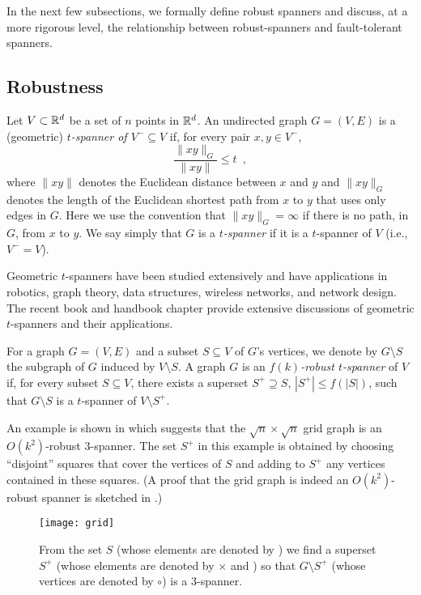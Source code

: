 \documentclass{cccg12}
\begin{document}
In the next few subsections, we formally define robust spanners
and discuss, at a more rigorous level, the relationship between
robust-spanners and fault-tolerant spanners.

\subsection{Robustness}

Let $V\subset \mathbb{R}^d$ be a set of $n$ points in $\mathbb{R}^d$.  An undirected
graph $G=(V,E)$ is a (geometric) \emph{$t$-spanner of $V^-\subseteq V$}
if, for every pair $x,y\in V^-$,
\[
  \frac{\|xy\|_G}{\|xy\|} \le t \enspace ,
\]
where $\|xy\|$ denotes the Euclidean distance between $x$ and $y$ and
$\|xy\|_G$ denotes the length of the Euclidean shortest path from $x$
to $y$ that uses only edges in $G$.  Here we use the convention that
$\|xy\|_G=\infty$ if there is no path, in $G$, from $x$ to $y$.  We say
simply that $G$ is a \emph{$t$-spanner} if it is a $t$-spanner of $V$
(i.e., $V^-=V$).

Geometric $t$-spanners have been studied extensively and have applications
in robotics, graph theory, data structures, wireless networks, and
network design.  The recent book \cite{ns07} and handbook chapter
\cite{e99} provide extensive discussions of geometric $t$-spanners and
their applications.

For a graph $G=(V,E)$ and a subset $S\subseteq V$ of $G$'s vertices, we
denote by $G\setminus S$ the subgraph of $G$ induced by $V\setminus S$.
A graph $G$ is an \emph{$f(k)$-robust $t$-spanner} of $V$ if, for every
subset $S\subseteq V$, there exists a superset $S^+\supseteq S$, $|S^+|\le
f(|S|)$, such that $G\setminus S$ is a $t$-spanner of $V\setminus S^+$.

An example is shown in  which suggests that the
$\sqrt{n}\times\sqrt{n}$ grid graph is an $O(k^2)$-robust 3-spanner.
The set $S^+$ in this example is obtained by choosing ``disjoint''
squares that cover the vertices of $S$ and adding to $S^+$ any vertices
contained in these squares.  (A proof that the grid graph is indeed an
$O(k^2)$-robust spanner is sketched in .)

\begin{figure}
  \begin{center}
    \texttt{[image: grid]}
  \end{center}
  \caption{From the set $S$ (whose elements are denoted by \textbullet)
  we find a superset $S^+$ (whose elements are denoted by $\times$ and
  \textbullet) so that $G\setminus S^+$ (whose vertices are denoted by
  $\circ$) is a 3-spanner.}
\end{figure}
\end{document}
